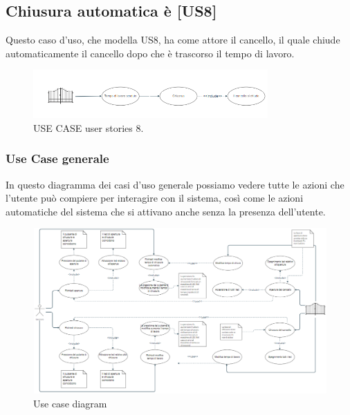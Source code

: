 \documentclass[12pt]{article}
\begin{document}
\subsection{Chiusura automatica è [US8]}
Questo caso d'uso, che modella US8, ha come attore il cancello, il quale chiude automaticamente il cancello dopo che è trascorso il tempo di lavoro.
    \begin{figure}[H]
        \centering
        \includegraphics[width=0.8\textwidth]{use_case_us8.PNG}
        \caption{USE CASE user stories 8.}
        \label{fig:use_case_us8}
    \end{figure}

\newpage
\begin{landscape}
\subsubsection{Use Case generale}
In questo diagramma dei casi d'uso generale possiamo vedere tutte le azioni che l'utente può compiere per interagire con il sistema, così come le azioni automatiche del sistema che si attivano anche senza la presenza dell'utente.
\begin{figure}[H] %
    \centering %
    \includegraphics[width=1.1\textwidth]{usa_case_diagram.PNG} %
    \caption{Use case diagram} %
    \label{fig:General Use Case DIagram} %
\end{figure}
\end{landscape}
\end{document}
